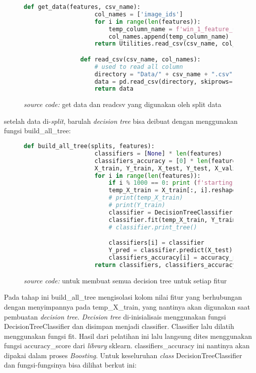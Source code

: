 		\begin{figure}[H]
			\begin{lstlisting}[language=Python, basicstyle=\tiny]
				def get_data(features, csv_name):
					col_names = ['image_ids']
					for i in range(len(features)):
						temp_column_name = f'win_1_feature_{i}'
						col_names.append(temp_column_name)
					return Utilities.read_csv(csv_name, col_names)

				def read_csv(csv_name, col_names):
					# used to read all column
					directory = "Data/" + csv_name + ".csv"
					data = pd.read_csv(directory, skiprows=1, header=None, names = col_names)
					return data
			\end{lstlisting}
			\caption{\emph{source code:} get data dan readcsv yang digunakan oleh split data}
			\label{code: get data and read csv}
		\end{figure}

		setelah data di-\textit{split}, barulah \emph{decision tree} bisa deibuat dengan menggunakan 
		fungsi build\_all\_tree:

		\begin{figure}[H]
			\begin{lstlisting}[language=Python, basicstyle=\tiny]
				def build_all_tree(splits, features):
					classifiers = [None] * len(features)
					classifiers_accuracy = [0] * len(features)
					X_train, Y_train, X_test, Y_test, X_valid, Y_valid = splits
					for i in range(len(features)):
						if i % 1000 == 0: print (f'starting tree {i}')
						temp_X_train = X_train[:, i].reshape(-1, 1)
						# print(temp_X_train)
						# print(Y_train)
						classifier = DecisionTreeClassifier(min_samples_split=3, max_depth=3)
						classifier.fit(temp_X_train, Y_train)
						# classifier.print_tree()

						classifiers[i] = classifier
						Y_pred = classifier.predict(X_test)
						classifiers_accuracy[i] = accuracy_score(Y_test, Y_pred)
					return classifiers, classifiers_accuracy
			\end{lstlisting}
			\caption{\emph{source code:} untuk membuat semua decision tree untuk setiap fitur}
			\label{code: make all decision tree}
		\end{figure}

		Pada tahap ini build\_all\_tree mengisolasi kolom nilai fitur yang berhubungan 
		dengan menyimpannya pada temp\_X\_train, yang nantinya akan digunakan saat pembuatan 
		\emph{decision tree}. \emph{Decision tree} di-inisialisais menggunakan fungsi
		DecisionTreeClassifier dan disimpan menjadi classifier. 
		Classifier lalu dilatih menggunakan fungsi fit. Hasil dari pelatihan ini lalu langsung dites menggunakan 
		fungsi accuracy\_score dari \textit{library} sklearn. classifiers\_accuracy ini nantinya 
		akan dipakai dalam proses \emph{Boosting}. Untuk keseluruhan \textit{class} DecisionTreeClassifier 
		dan fungsi-fungsinya bisa dilihat berkut ini:

